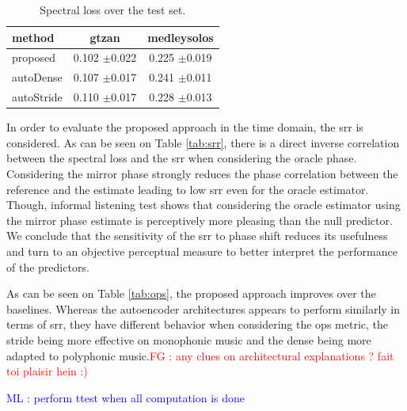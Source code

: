 \documentclass{article}
\newcommand{\ml}[1]{\textcolor{blue}{ML : #1}}
\newcommand{\fg}[1]{\textcolor{red}{FG : #1}}
\begin{document}
\begin{table}[t]
  \begin{center}
\begin{tabular}{lcc}
method & gtzan & medleysolos \\
\hline
proposed & 0.102 $\pm$0.022 & 0.225 $\pm$0.019 \\
autoDense & 0.107 $\pm$0.017 & 0.241 $\pm$0.011 \\
autoStride & 0.110 $\pm$0.017 & 0.228 $\pm$0.013 \\
\end{tabular}
\caption{Spectral loss over the test set.}
\label{tab:loss}
\end{center}
\vspace{-4mm}
\end{table}

In order to evaluate the proposed approach in the time domain, the srr is considered. As can be seen on Table \ref{tab:srr}, there is a direct inverse correlation between the spectral loss and the srr when considering the oracle phase. Considering the mirror phase strongly reduces the phase correlation between the reference and the estimate leading to low srr even for the oracle estimator. Though, informal listening test shows that considering the oracle estimator using the mirror phase estimate is perceptively more pleasing than the null predictor. We conclude that the sensitivity of the srr to phase shift reduces its usefulness and turn to an objective perceptual measure to better interpret the performance of the predictors.

 As can be seen on Table \ref{tab:ops}, the proposed approach improves over the baselines. Whereas the autoencoder architectures appears to perform similarly in terms of srr, they have different behavior when considering the ops metric, the stride being more effective on monophonic music and the dense being more adapted to polyphonic music.\fg{any clues on architectural explanations ? fait toi plaisir hein :)}

 \ml{perform ttest when all computation is done}
\end{document}
